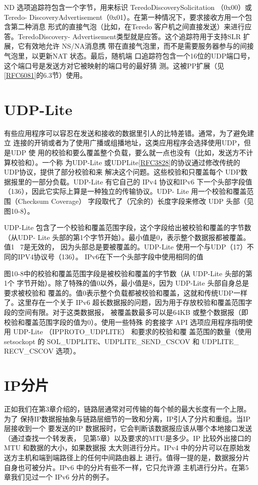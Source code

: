 ND 选项追踪符包含一个字节，用来标识 TeredoDiscoverySolicitation （0x00）或 Teredo-
DiscoveryAdvertisement（0x01）。在第一种情况下，要求接收方用一个包含第二种消息
形式的直接气泡（比如，在Teredo 客户机之间直接发送）来进行应答。TeredoDiscovery-
Advertisement类型就是应答。这个追踪符用于支持SLR 扩展，它有效地允许 NS/NA消息携
带在直接气泡里，而不是需要服务器参与的间接气泡里，以更新NAT 状态。最后，随机端
口追踪符包含一个16位的UDP端口号，这个端口号是发送方对它被映射的端口号的最好猜
测。这被PP扩展（见\href{https://www.rfc-editor.org/rfc/rfc6081}{[RFC6081]}的6.3节）使用。

\section{UDP-Lite}
有些应用程序可以容忍在发送和接收的数据里引人的比特差错。通常，为了避免建立
连接的开销或者为了使用广播或组播地址，这类应用程序会选择使用UDP，但是UDP 使
用的校验和要么覆盖整个负载，要么就一点也没有（比如，发送方不计算校验和）。一个称
为UDP-Lite
或UDPLite\href{https://www.rfc-editor.org/rfc/rfc3828}{[RFC3828]}的协议通过修改传统的UDP协议，提供了部分校验和来
解决这个问题。这些校验和只覆盖每个 UDP数据报里的一部分负载。UDP-Lite 有它自己的
IPv4 协议和IPv6 下一个头部字段值（136），因此它实际上算是一种独立的传输协议。UDP-
Lite 用一个校验和覆盖范围（Checksum Coverage） 字段取代了（冗余的）长度字段来修改
UDP 头部（见图10-8）。

UDP-Lite 包含了一个校验和覆盖范围字段，这个字段给出被校验和覆盖的字节数（从UDP-
Lite 头部的第1个字节开始）。最小值是0，表示整个数据报都被覆盖。值1 ~7是无效的，
因为头部总是要被覆盖的。UDP-Lite 使用一个与UDP（17）不同的IPV4协议号（136）。
IPv6在下一个头部字段中使用相同的值

图10-8中的校验和覆盖范围字段是被校验和覆盖的字节数（从 UDP-Lite 头部的第1个
字节开始）。除了特殊的值0以外，最小值是8，因为 UDP-Lite 头部自身总是要求被校验和
覆盖的。值0表示整个负载都被校验和覆盖，这就和传统UDP一样了。这里存在一个关于
IPv6 超长数据报的问题，因为用于存放校验和覆盖范围字段的空间有限。对于这类数据报，
被覆盖数最多可以是64KB 或整个数据报（即校验和覆盖范围字段的值为0）。使用一些特殊
的套接字 API 选项应用程序指明使用 UDP-Lite （IPPROTO\_UDPLITE） 和要求的校验和覆
盖范围的数量（使用 setsockopt 的 SOL\_UDPLITE、UDPLITE\_SEND\_CSCOV 和 UDPLITE\_
RECV\_CSCOV 选项）。

\section{IP分片}
正如我们在第3章介绍的，链路层通常对可传输的每个帧的最大长度有一个上限。为了
保持IP数据报抽象与链路层细节的一致和分离，IP引人了分片和重组。当IP 层接收到一个
要发送的IP 数据报时，它会判断该数据报应该从哪个本地接口发送（通过查找一个转发表，
见第5章）以及要求的MTU是多少。IP 比较外出接口的MTU 和数据的大小，如果数据报
太大则进行分片。IPv4 中的分片可以在原始发送方主机和端到端路径上的任何中间路由器上
进行。值得一提的是，数据报分片自身也可被分片。IPv6 中的分片有些不一样，它只允许源
主机进行分片。在第5章我们见过一个 IPv6 分片的例子。

